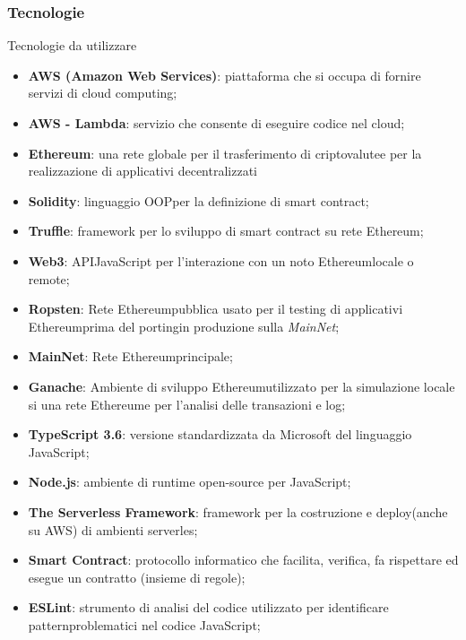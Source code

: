 \subsubsection{Tecnologie}
Tecnologie da utilizzare
\begin{itemize}
	\item \textbf{AWS (Amazon Web Services)}: piattaforma che si occupa di fornire servizi di cloud computing\glo;
	\item \textbf{AWS - Lambda}: servizio che consente di eseguire codice nel cloud;
	\item \textbf{Ethereum}: una rete globale per il trasferimento di criptovalute\glo e per la realizzazione di applicativi decentralizzati
	\item \textbf{Solidity}: linguaggio OOP\glo per la definizione di smart contract\glo;
	\item \textbf{Truffle}: framework per lo sviluppo di smart contract su rete Ethereum\glo;
	\item \textbf{Web3}: API\glo JavaScript per l'interazione con un noto Ethereum\glo locale o remote;
	\item \textbf{Ropsten}: Rete Ethereum\glo pubblica usato per il testing di applicativi Ethereum\glo prima del porting\glo in produzione sulla \textit{MainNet};
	\item \textbf{MainNet}: Rete Ethereum\glo principale;
	\item \textbf{Ganache}: Ambiente di sviluppo Ethereum\glo utilizzato per la simulazione locale si una rete Ethereum\glo e per l'analisi delle transazioni e log;
	\item \textbf{TypeScript 3.6}: versione standardizzata da Microsoft del linguaggio JavaScript;
	\item \textbf{Node.js}: ambiente di runtime open-source per JavaScript;
	\item \textbf{The Serverless Framework}: framework per la costruzione e deploy\glo (anche su AWS) di ambienti serverles\glo;
	\item \textbf{Smart Contract}: protocollo informatico che facilita, verifica, fa rispettare ed esegue un contratto (insieme di regole);
	\item \textbf{ESLint}: strumento di analisi del codice utilizzato per identificare pattern\glo problematici nel codice JavaScript;
\end{itemize}
